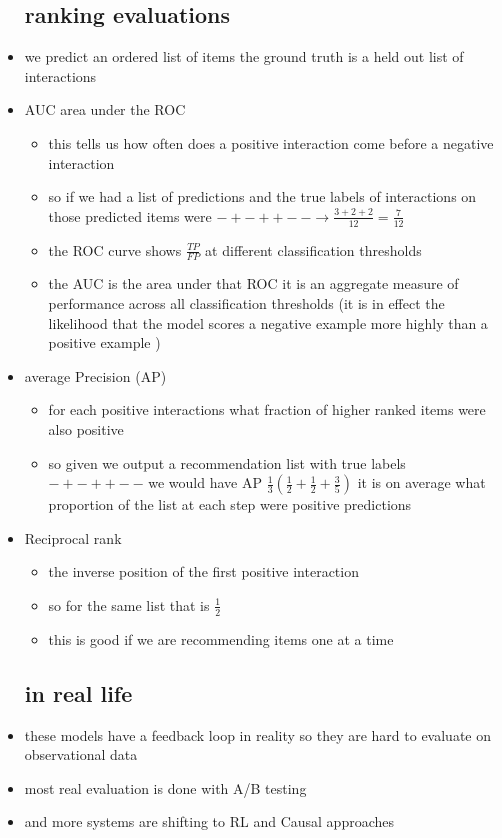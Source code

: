 \documentclass{article}
\begin{document}
\begin{itemize}
\subsection*{ranking evaluations}
\item we predict an ordered list of items the ground truth is a held out list of interactions
\item AUC area under the ROC 
\begin{itemize}
    \item this tells us how often does a positive interaction come before a negative interaction
    \item so if we had a list of predictions and the true labels of interactions on those predicted items were $-+-++--\rightarrow \frac{3+2+2}{12}=\frac{7}{12}$
    \item the ROC curve shows $\frac{TP}{FP}$ at different classification thresholds 
    \item the AUC is the area under that ROC it is an aggregate measure of performance across all classification thresholds (it is in effect the likelihood that the model scores a negative example more highly than a positive example  )
\end{itemize}
\item average Precision (AP)
\begin{itemize}
    \item for each positive interactions what fraction of higher ranked items were also positive
    \item so given we output a recommendation list with true labels  $-+-++--$ we would have AP $\frac{1}{3}(\frac{1}{2}+\frac{1}{2}+\frac{3}{5})$ it is on average what proportion of the list at each step were positive predictions 
\end{itemize}
\item Reciprocal rank 
\begin{itemize}
    \item the inverse position of the first positive interaction
    \item so for the same list that is $\frac{1}{2}$
    \item this is good if we are recommending items one at  a time 
\end{itemize}
\subsection*{in real life }
\item  these models have a feedback loop in reality so they are hard to evaluate on observational data 
\item most real evaluation is done with A/B testing 
\item and more systems are shifting to RL and Causal approaches 

\end{itemize}
\end{document}
